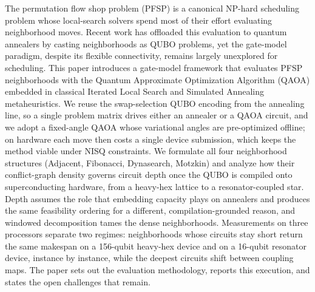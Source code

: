 \documentclass[11pt,a4paper]{article}
\begin{document}
\noindent
The permutation flow shop problem (PFSP) is a canonical NP-hard
scheduling problem whose local-search solvers spend most of their
effort evaluating neighborhood moves. Recent work has offloaded this
evaluation to quantum annealers by casting neighborhoods as QUBO
problems, yet the gate-model paradigm, despite its flexible
connectivity, remains largely unexplored for scheduling. This paper
introduces a gate-model framework that evaluates PFSP neighborhoods with
the Quantum Approximate Optimization Algorithm (QAOA) embedded in
classical Iterated Local Search and Simulated Annealing metaheuristics.
We reuse the swap-selection QUBO encoding from the annealing
line, so a single problem matrix drives either an annealer or a QAOA
circuit, and we adopt a fixed-angle QAOA whose variational angles are
pre-optimized offline; on hardware each move then costs a single device
submission, which keeps the method viable under NISQ constraints. We
formulate all four neighborhood structures (Adjacent, Fibonacci,
Dynasearch, Motzkin) and analyze how their conflict-graph density
governs circuit depth once the QUBO is compiled onto superconducting
hardware, from a heavy-hex lattice to a resonator-coupled star. Depth
assumes the role that embedding capacity plays on annealers and produces
the same feasibility ordering for a different, compilation-grounded
reason, and windowed decomposition tames the dense neighborhoods.
Measurements on three processors separate two regimes: neighborhoods
whose circuits stay short return the same makespan on a 156-qubit
heavy-hex device and on a 16-qubit resonator device, instance by
instance, while the deepest circuits shift between coupling maps. The
paper sets out the evaluation methodology, reports this execution, and
states the open challenges that remain.
\end{document}
